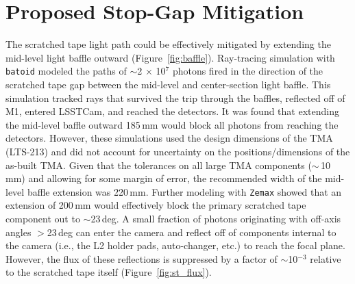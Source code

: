 \documentclass[SE,authoryear,toc]{lsstdoc}
\begin{document}

%
%

\section{Proposed Stop-Gap Mitigation}
\label{sec:mitigation}

The scratched tape light path could be effectively mitigated by extending the mid-level light baffle outward (Figure~\ref{fig:baffle}).
Ray-tracing simulation with \texttt{batoid} modeled the paths of ${\sim}$2 $\times$ 10$^7$ photons fired in the direction of the scratched tape gap between the mid-level and center-section light baffle. This simulation tracked rays that survived the trip through the baffles, reflected off of M1, entered LSSTCam, and reached the detectors. It was found that extending the mid-level baffle outward 185\,mm would block all photons from reaching the detectors. However, these simulations used the design dimensions of the TMA (LTS-213) and did not account for uncertainty on the positions/dimensions of the as-built TMA.
Given that the tolerances on all large TMA components ($\sim$\,10\,mm) and allowing for some margin of error, the recommended width of the mid-level baffle extension was 220\,mm. Further modeling with \texttt{Zemax} showed that an extension of 200\,mm would effectively block the primary scratched tape component out to $\sim$23\,deg. A small fraction of  photons originating with off-axis angles $>$23\,deg can enter the camera and reflect off of components internal to the camera (i.e., the L2 holder pads, auto-changer, etc.) to reach the focal plane. However, the flux of these reflections is suppressed by a factor of $\sim$10$^{-3}$ relative to the scratched tape itself (Figure~\ref{fig:st_flux}).
\end{document}
